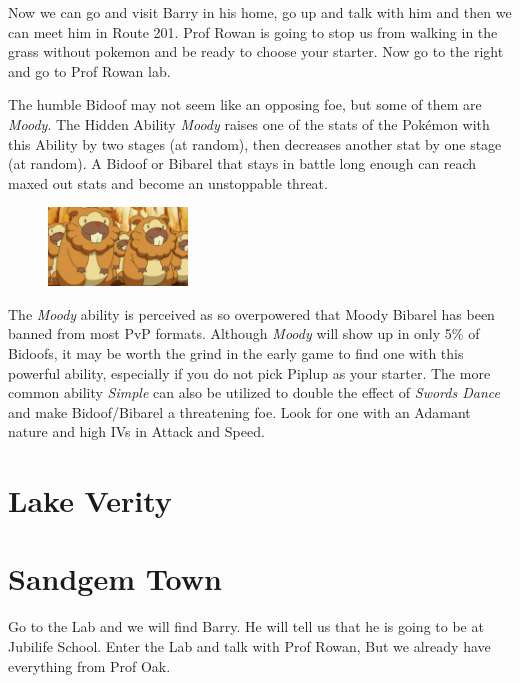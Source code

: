\documentclass[11pt]{article}
\begin{document}
Now we can go and visit Barry in his home, go up and talk with him
and then we can meet him in Route 201.
Prof  Rowan is going to stop us from walking in the grass without pokemon
and be ready to choose your starter.
Now go to the right and go to Prof Rowan lab.



\begin{mdframed}[style=PokemonSpotlight,nobreak=true,frametitle={Pokemon Spotlight: Bidoof}]
The humble Bidoof may not seem like an opposing foe, but some of them are \emph{Moody}.
The Hidden Ability \emph{Moody} raises one of the stats of the Pokémon with this
Ability by two stages (at random), then decreases another stat by one stage (at random).
A Bidoof or Bibarel that stays in battle long enough can reach maxed out stats
and become an unstoppable threat.

\begin{figure}
\includegraphics[width=0.33\textwidth]{walkthrough/Sinnoh/spotlight-bidoof}
\label{fig:spotlight-bidoof}
\end{figure}

The \emph{Moody} ability is perceived as so overpowered that Moody Bibarel has been
banned from most PvP formats.
Although \emph{Moody} will show up in only 5\% of Bidoofs, it may be worth the
grind in the early game to find one with this powerful ability, especially if
you do not pick Piplup as your starter.
The more common ability \emph{Simple} can also be utilized to double the effect of
\emph{Swords Dance} and make Bidoof/Bibarel a threatening foe.
Look for one with an Adamant nature and high IVs in Attack and Speed.
\end{mdframed}

\section{Lake Verity}\label{sec:Lake_Verity}




\section{Sandgem Town}\label{sec:sandgem-town}
Go to the Lab and we will find Barry. He will tell us that he is going to be at Jubilife School.
Enter the Lab and talk with Prof Rowan, But we already have everything from Prof Oak.
\end{document}
